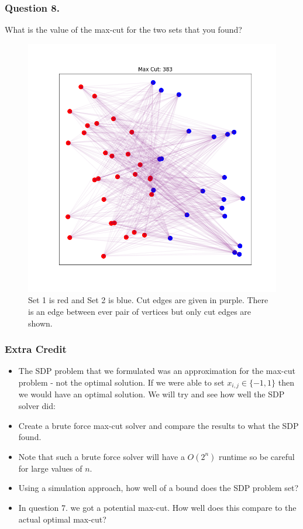 \documentclass{article}
\begin{document}
\subsubsection{Question 8.}
What is the value of the max-cut for the two sets that you found?


\begin{figure}[ht]
  \centering
  \includegraphics[scale=.5]{assets/max-cut-solution.png}
  \caption{Set 1 is red and Set 2 is blue. Cut edges are given in purple. There is an edge between ever pair of vertices but only cut edges are shown.}
\end{figure}

\subsubsection{Extra Credit}
\begin{itemize}
\item\label{item:1} The SDP problem that we formulated was an approximation for the max-cut problem - not the optimal solution. If we were able to set \( x_{i, j} \in \{ -1, 1 \} \) then we would have an optimal solution. We will try and see how well the SDP solver did:
\item\label{item:2}
Create a brute force max-cut solver and compare the results to what the SDP found.
\item\label{item:3}
Note that such a brute force solver will have a \( O(2^n) \) runtime so be careful for large values of \( n \).
\item\label{item:4}
Using a simulation approach, how well of a bound does the SDP problem set?
\item\label{item:5}
In question 7. we got a potential max-cut. How well does this compare to the actual optimal max-cut?
\end{itemize}
\end{document}
